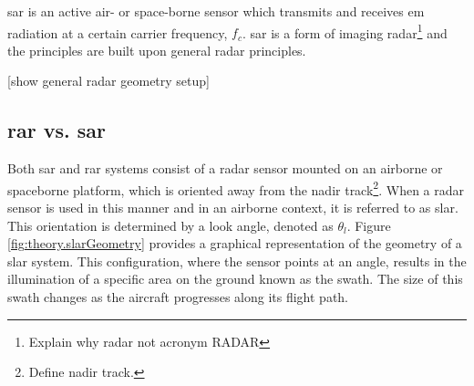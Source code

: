 \acs{sar} is an active air- or space-borne sensor which transmits and receives \acs{em} radiation at a certain carrier frequency, $f_c$. \acs{sar} is a form of imaging radar\footnote{Explain why radar not acronym RADAR} and the principles are built upon general radar principles. 

[show general radar geometry setup]


\subsection{\acs{rar} vs. \acs{sar}} \label{subsec:theory.RARvSAR}

Both \acs{sar} and \ac{rar} systems consist of a radar sensor mounted on an airborne or spaceborne platform, which is oriented away from the nadir track\footnote{Define nadir track.}. When a radar sensor is used in this manner and in an airborne context, it is referred to as \ac{slar}.  This orientation is determined by a look angle, denoted as $\theta_{l}$. Figure \ref{fig:theory.slarGeometry} provides a graphical representation of the geometry of a \acs{slar} system. This configuration, where the sensor points at an angle, results in the illumination of a specific area on the ground known as the swath. The size of this swath changes as the aircraft progresses along its flight path.

